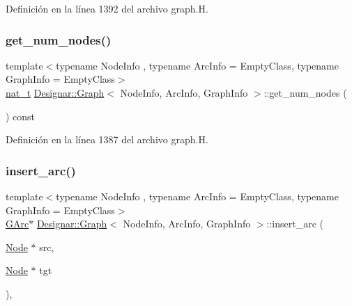 Definición en la línea 1392 del archivo graph.\+H.

\mbox{\label{class_designar_1_1_graph_af6f0ef48386dd1353880ff706387c4e8}} 
\subsubsection{\texorpdfstring{get\+\_\+num\+\_\+nodes()}{get\_num\_nodes()}}
{\footnotesize\ttfamily template$<$typename Node\+Info , typename Arc\+Info  = Empty\+Class, typename Graph\+Info  = Empty\+Class$>$ \\
\hyperlink{namespace_designar_aa72662848b9f4815e7bf31a7cf3e33d1}{nat\+\_\+t} \hyperlink{class_designar_1_1_graph}{Designar\+::\+Graph}$<$ Node\+Info, Arc\+Info, Graph\+Info $>$\+::get\+\_\+num\+\_\+nodes (\begin{DoxyParamCaption}{ }\end{DoxyParamCaption}) const\hspace{0.3cm}{\ttfamily [inline]}}



Definición en la línea 1387 del archivo graph.\+H.

\mbox{\label{class_designar_1_1_graph_a20f183a1481fb62bc775aca6bd3244d1}} 
\subsubsection{\texorpdfstring{insert\+\_\+arc()}{insert\_arc()}\hspace{0.1cm}{\footnotesize\ttfamily [1/4]}}
{\footnotesize\ttfamily template$<$typename Node\+Info , typename Arc\+Info  = Empty\+Class, typename Graph\+Info  = Empty\+Class$>$ \\
\hyperlink{class_designar_1_1_graph_a5ad9e18b71899c2d4979426e367e5573}{G\+Arc}$\ast$ \hyperlink{class_designar_1_1_graph}{Designar\+::\+Graph}$<$ Node\+Info, Arc\+Info, Graph\+Info $>$\+::insert\+\_\+arc (\begin{DoxyParamCaption}\item[{\hyperlink{class_designar_1_1_graph_a5dfc7dba9d092ac489c72e40390c37d0}{Node} $\ast$}]{src,  }\item[{\hyperlink{class_designar_1_1_graph_a5dfc7dba9d092ac489c72e40390c37d0}{Node} $\ast$}]{tgt }\end{DoxyParamCaption})\hspace{0.3cm}{\ttfamily [inline]}, {\ttfamily [protected]}}



